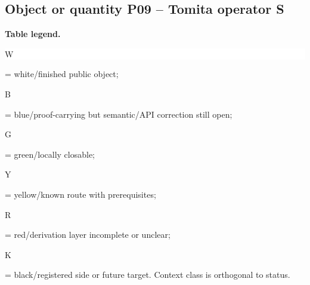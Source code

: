 \subsection*{Object or quantity P09 -- Tomita operator S}
\hypertarget{objproof:P09}{}
\par\smallskip\noindent\begin{minipage}{0.99\linewidth}\footnotesize\raggedright\textbf{Table legend.} \colorbox{white}{\strut W} = white/finished public object; \colorbox{cyan!20}{\strut B} = blue/proof-carrying but semantic/API correction still open; \colorbox{green!18}{\strut G} = green/locally closable; \colorbox{yellow!25}{\strut Y} = yellow/known route with prerequisites; \colorbox{red!20}{\strut R} = red/derivation layer incomplete or unclear; \colorbox{black!18}{\strut K} = black/registered side or future target. Context class is orthogonal to status.\end{minipage}\par\vspace{0.25em}
